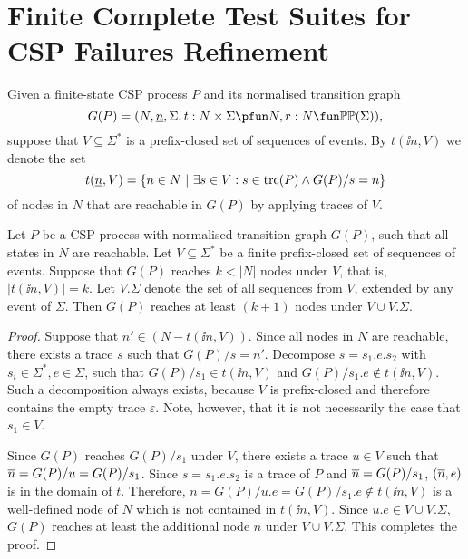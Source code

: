 \section{Finite Complete Test Suites for CSP Failures Refinement}
\label{sec:finitecompletefails}



Given a finite-state CSP process $P$ and its normalised transition graph 
\[
G(P) = ( N, \ii n, \Sigma, t : N\times\Sigma \pfun N, r : N \fun \mathbb{P}\mathbb{P}(\Sigma)),
\]
suppose that $V\subseteq\Sigma^*$ is a 
prefix-closed set  of sequences of events. By $t(\ii n,V)$ we denote the set
\[
t(\underline{n},V) = \{ n\in N~|~\exists s\in V: s\in\text{trc}(P)\wedge G(P)/s = n \}
\] 
of nodes in $N$ that are reachable in $G(P)$ by applying traces of $V$.

\begin{lemma}
\label{lemma:extendV}
Let $P$ be a CSP process with normalised transition graph $G(P)$, 
such that all states in $N$ are reachable.
Let $V\subseteq\Sigma^*$ be a finite prefix-closed set of
sequences of events. Suppose that  $G(P)$ reaches $k < |N|$ nodes under $V$, that is,
$|t(\ii n,V)| = k$. Let $V.\Sigma$ denote the set of all sequences from $V$, 
extended by any event of $\Sigma$.
Then $G(P)$ reaches at least $(k+1)$ nodes under $V\cup V.\Sigma$.
\end{lemma}
\begin{proof}
Suppose that $n'\in (N - t(\ii n,V))$.  Since all nodes in $N$ are reachable, there exists
a trace $s$ such that $G(P)/s = n'$. Decompose $s = s_1.e.s_2$ with $s_i\in\Sigma^*, e\in\Sigma$, such that $G(P)/s_1 \in t(\ii n,V)$ and $G(P)/s_1.e \not\in t(\ii n,V)$. Such a decomposition always exists, because $V$ is prefix-closed and therefore contains the empty trace $\varepsilon$. Note, however, that it is not necessarily the case that $s_1\in V$.

Since $G(P)$ reaches $G(P)/s_1$ under $V$, there exists a trace $u\in V$ such that
$\overline n = G(P)/u = G(P)/s_1$. Since $s = s_1.e.s_2$ is a trace of $P$ and 
$\overline n = G(P)/s_1$,
$(\overline n,e)$ is in the domain of $t$. Therefore,  
$n = G(P)/u.e = G(P)/s_1.e \not\in t(\ii n,V)$ is a well-defined node
of $N$ which is not contained in $t(\ii n,V)$. Since $u.e\in V\cup V.\Sigma$,
$G(P)$ reaches at least the additional node $n$ under $V\cup V.\Sigma$. This completes the proof.
\xbox
\end{proof}














